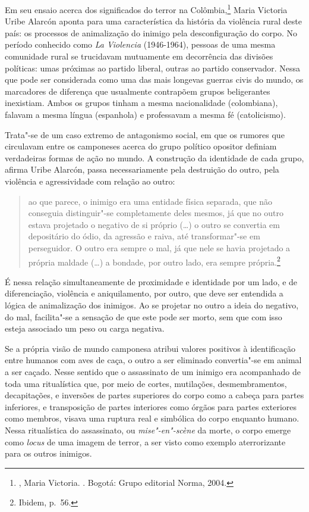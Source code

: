 \asterisc

Em seu ensaio acerca dos significados do terror na Colômbia,\footnote{, Maria Victoria. {}. Bogotá: Grupo
  editorial Norma, 2004.} Maria Victoria Uribe Alarcón aponta
para uma característica da história da violência rural deste país: os
processos de animalização do inimigo pela desconfiguração do corpo. No
período conhecido como \emph{La Violencia} (1946-1964), pessoas de uma
mesma comunidade rural se trucidavam mutuamente em decorrência das
divisões políticas: umas próximas ao partido liberal, outras ao partido
conservador. Nessa que pode ser considerada como uma das mais longevas
guerras civis do mundo, os marcadores de diferença que usualmente
contrapõem grupos beligerantes inexistiam. Ambos os grupos tinham a
mesma nacionalidade (colombiana), falavam a mesma língua (espanhola) e
professavam a mesma fé (catolicismo).

Trata"-se de um caso extremo de antagonismo social, em que os rumores que
circulavam entre os camponeses acerca do grupo político opositor definiam verdadeiras formas de ação no mundo. A construção da identidade
de cada grupo, afirma Uribe Alarcón, passa necessariamente pela
destruição do outro, pela violência e agressividade com relação ao
outro:

\begin{quote}
ao que parece, o inimigo era uma entidade física separada, que não
conseguia distinguir"-se completamente deles mesmos, já que no outro
estava projetado o negativo de si próprio (\ldots{}) o outro se convertia em
depositário do ódio, da agressão e raiva, até transformar"-se em
perseguidor. O outro era sempre o mal, já que nele se havia projetado a
própria maldade (\ldots{}) a bondade, por outro lado, era sempre
própria.\footnote{Ibidem, p.~56.}
\end{quote}

É nessa relação simultaneamente de proximidade e identidade por um lado,
e de diferenciação, violência e aniquilamento, por outro, que deve ser
entendida a lógica de animalização dos inimigos. Ao se projetar no outro
a ideia do negativo, do mal, facilita"-se a sensação de que este pode ser
morto, sem que com isso esteja associado um peso ou carga negativa.

Se a própria visão de mundo camponesa atribui valores positivos à
identificação entre humanos com aves de caça, o outro a ser eliminado
convertia"-se em animal a ser caçado. Nesse sentido que o assassinato de
um inimigo era acompanhado de toda uma ritualística que, por meio de
cortes, mutilações, desmembramentos, decapitações, e inversões de partes
superiores do corpo como a cabeça para partes inferiores, e transposição
de partes interiores como órgãos para partes exteriores como membros,
visava uma ruptura real e simbólica do corpo enquanto humano. Nessa
ritualística do assassinato, ou \emph{mise"-en"-scène} da morte, o corpo emerge
como \emph{locus} de uma imagem de terror, a ser visto como exemplo
aterrorizante para os outros inimigos.

